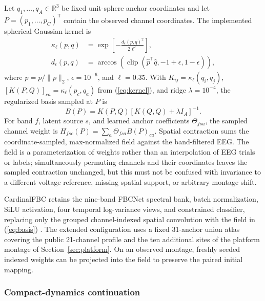 \documentclass[journal,twoside,web]{template/ieeecolor2-tectonic}
\begin{document}
Let $q_1,\ldots,q_A\in\mathbb{R}^3$ be fixed unit-sphere anchor coordinates and let $P=(p_1,\ldots,p_C)^\mathsf{T}$ contain the observed channel coordinates. The implemented spherical Gaussian kernel is
\begin{equation}
\begin{aligned}
\kappa_\ell(p,q)
  &=\exp\left[-\frac{d_\epsilon(p,q)^2}{2\ell^2}\right],\\
d_\epsilon(p,q)
  &=\arccos\!\left(\operatorname{clip}
    (\widehat p^\mathsf{T}\widehat q,-1+\epsilon,1-\epsilon)\right),
\end{aligned}
\label{eq:kernel}
\end{equation}
where $\widehat p=p/\lVert p\rVert_2$, $\epsilon=10^{-6}$, and $\ell=0.35$. With $K_{ij}=\kappa_\ell(q_i,q_j)$, $[K(P,Q)]_{ca}=\kappa_\ell(p_c,q_a)$ from (\ref{eq:kernel}), and ridge $\lambda=10^{-4}$, the regularized basis sampled at $P$ is
\begin{equation}
B(P)=K(P,Q)\left[K(Q,Q)+\lambda I_A\right]^{-1}.
\label{eq:basis}
\end{equation}
For band $f$, latent source $s$, and learned anchor coefficients $\Theta_{fsa}$, the sampled channel weight is $H_{fsc}(P)=\sum_a\Theta_{fsa}B(P)_{ca}$. Spatial contraction sums the coordinate-sampled, max-normalized field against the band-filtered EEG. The field is a parameterization of weights rather than an interpolation of EEG trials or labels; simultaneously permuting channels and their coordinates leaves the sampled contraction unchanged, but this must not be confused with invariance to a different voltage reference, missing spatial support, or arbitrary montage shift.

CardinalFBC retains the nine-band FBCNet spectral bank, batch normalization, SiLU activation, four temporal log-variance views, and constrained classifier, replacing only the grouped channel-indexed spatial convolution with the field in (\ref{eq:basis}) \cite{Mane2021}. The extended configuration uses a fixed 31-anchor union atlas covering the public 21-channel profile and the ten additional sites of the platform montage of Section~\ref{sec:platform}. On an observed montage, freshly seeded indexed weights can be projected into the field to preserve the paired initial mapping.

\subsubsection{Compact-dynamics continuation}
\end{document}
